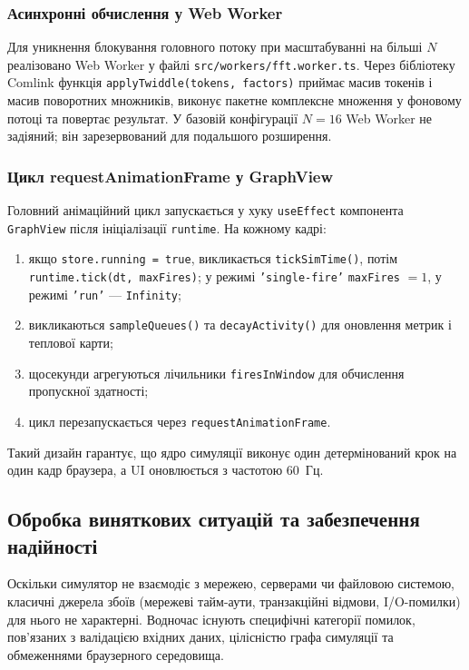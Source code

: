 \subsubsection*{Асинхронні обчислення у Web Worker}

Для уникнення блокування головного потоку при масштабуванні на
більші $N$ реалізовано Web Worker у файлі
\texttt{src/workers/fft.worker.ts}. Через бібліотеку Comlink
функція \texttt{applyTwiddle(tokens, factors)} приймає масив
токенів і масив поворотних множників, виконує пакетне комплексне
множення у фоновому потоці та повертає результат. У базовій
конфігурації $N = 16$ Web Worker не задіяний; він зарезервований
для подальшого розширення.

\subsubsection*{Цикл requestAnimationFrame у GraphView}

Головний анімаційний цикл запускається у хуку \texttt{useEffect}
компонента \texttt{GraphView} після ініціалізації \texttt{runtime}.
На кожному кадрі:

\begin{enumerate}
  \item якщо \texttt{store.running = true}, викликається
        \texttt{tickSimTime()}, потім
        \texttt{runtime.tick(dt, maxFires)}; у режимі
        \texttt{'single-fire'} \texttt{maxFires} $= 1$, у режимі
        \texttt{'run'} --- \texttt{Infinity};
  \item викликаються \texttt{sampleQueues()} та
        \texttt{decayActivity()} для оновлення метрик і теплової
        карти;
  \item щосекунди агрегуються лічильники \texttt{firesInWindow} для
        обчислення пропускної здатності;
  \item цикл перезапускається через \texttt{requestAnimationFrame}.
\end{enumerate}

Такий дизайн гарантує, що ядро симуляції виконує один детермінований
крок на один кадр браузера, а UI оновлюється з частотою 60~Гц.


\subsection{Обробка виняткових ситуацій та забезпечення надійності}

Оскільки симулятор не взаємодіє з мережею, серверами чи файловою
системою, класичні джерела збоїв (мережеві тайм-аути, транзакційні
відмови, I/O-помилки) для нього не характерні. Водночас існують
специфічні категорії помилок, пов'язаних з валідацією вхідних даних,
цілісністю графа симуляції та обмеженнями браузерного середовища.

